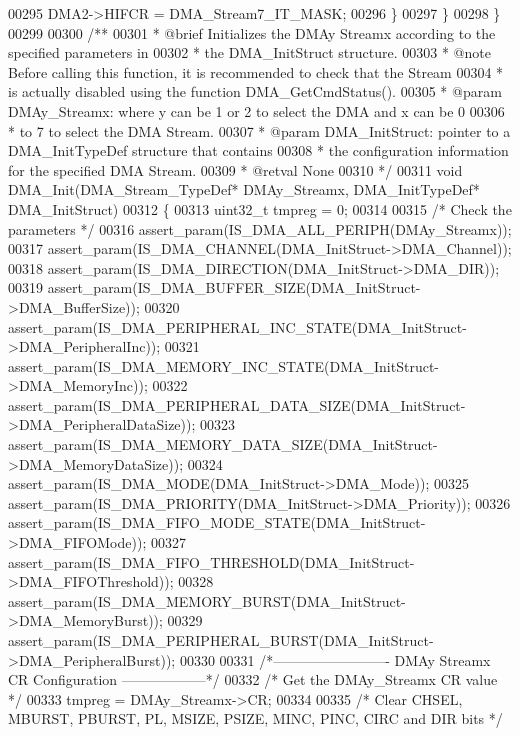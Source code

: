 \begin{DoxyCode}
00295       DMA2->HIFCR = DMA_Stream7_IT_MASK;
00296     \}
00297   \}
00298 \}
00299 
00300 \textcolor{comment}{/**}
00301 \textcolor{comment}{  * @brief  Initializes the DMAy Streamx according to the specified parameters in }
00302 \textcolor{comment}{  *         the DMA\_InitStruct structure.}
00303 \textcolor{comment}{  * @note   Before calling this function, it is recommended to check that the Stream }
00304 \textcolor{comment}{  *         is actually disabled using the function DMA\_GetCmdStatus().  }
00305 \textcolor{comment}{  * @param  DMAy\_Streamx: where y can be 1 or 2 to select the DMA and x can be 0}
00306 \textcolor{comment}{  *         to 7 to select the DMA Stream.}
00307 \textcolor{comment}{  * @param  DMA\_InitStruct: pointer to a DMA\_InitTypeDef structure that contains}
00308 \textcolor{comment}{  *         the configuration information for the specified DMA Stream.  }
00309 \textcolor{comment}{  * @retval None}
00310 \textcolor{comment}{  */}
00311 \textcolor{keywordtype}{void} DMA_Init(DMA\_Stream\_TypeDef* DMAy\_Streamx, DMA\_InitTypeDef* DMA\_InitStruct)
00312 \{
00313   uint32\_t tmpreg = 0;
00314 
00315   \textcolor{comment}{/* Check the parameters */}
00316   assert_param(IS\_DMA\_ALL\_PERIPH(DMAy\_Streamx));
00317   assert_param(IS\_DMA\_CHANNEL(DMA\_InitStruct->DMA\_Channel));
00318   assert_param(IS\_DMA\_DIRECTION(DMA\_InitStruct->DMA\_DIR));
00319   assert_param(IS\_DMA\_BUFFER\_SIZE(DMA\_InitStruct->DMA\_BufferSize));
00320   assert_param(IS\_DMA\_PERIPHERAL\_INC\_STATE(DMA\_InitStruct->DMA\_PeripheralInc));
00321   assert_param(IS\_DMA\_MEMORY\_INC\_STATE(DMA\_InitStruct->DMA\_MemoryInc));
00322   assert_param(IS\_DMA\_PERIPHERAL\_DATA\_SIZE(DMA\_InitStruct->DMA\_PeripheralDataSize));
00323   assert_param(IS\_DMA\_MEMORY\_DATA\_SIZE(DMA\_InitStruct->DMA\_MemoryDataSize));
00324   assert_param(IS\_DMA\_MODE(DMA\_InitStruct->DMA\_Mode));
00325   assert_param(IS\_DMA\_PRIORITY(DMA\_InitStruct->DMA\_Priority));
00326   assert_param(IS\_DMA\_FIFO\_MODE\_STATE(DMA\_InitStruct->DMA\_FIFOMode));
00327   assert_param(IS\_DMA\_FIFO\_THRESHOLD(DMA\_InitStruct->DMA\_FIFOThreshold));
00328   assert_param(IS\_DMA\_MEMORY\_BURST(DMA\_InitStruct->DMA\_MemoryBurst));
00329   assert_param(IS\_DMA\_PERIPHERAL\_BURST(DMA\_InitStruct->DMA\_PeripheralBurst));
00330 
00331   \textcolor{comment}{/*------------------------- DMAy Streamx CR Configuration ------------------*/}
00332   \textcolor{comment}{/* Get the DMAy\_Streamx CR value */}
00333   tmpreg = DMAy\_Streamx->CR;
00334 
00335   \textcolor{comment}{/* Clear CHSEL, MBURST, PBURST, PL, MSIZE, PSIZE, MINC, PINC, CIRC and DIR bits */}

\end{DoxyCode}
